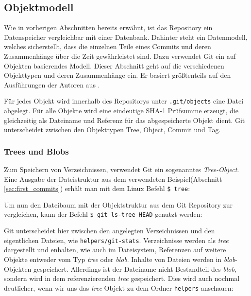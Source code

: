 \subsection{Objektmodell}\label{sec:objectmodel}
Wie in vorherigen Abschnitten bereits erwähnt, ist das Repository ein
Datenspeicher vergleichbar mit einer Datenbank. Dahinter steht ein Datenmodell,
welches sicherstellt, dass die einzelnen Teile eines Commits und deren
Zusammenhänge über die Zeit gewährleistet sind. Dazu verwendet Git ein auf
Objekten basierendes Modell. Dieser Abschnitt geht auf die verschiedenen
Objekttypen und deren Zusammenhänge ein. Er basiert größtenteils auf den
Ausführungen der Autoren aus \cite[S.~49-59]{gitosp}.

Für jedes Objekt wird innerhalb des Repositorys unter \texttt{.git/objects}
eine Datei abgelegt. Für alle Objekte wird eine eindeutige \gls{SHA-1}
Prüfsumme erzeugt, die gleichzeitig als Dateiname und Referenz für das
abgespeicherte Objekt dient. Git unterscheidet zwischen den Objekttypen Tree,
Object, Commit und Tag.

\subsubsection{Trees und Blobs}\label{sec:treeblobobjects}
Zum Speichern von Verzeichnissen, verwendet Git ein sogenanntes
\textit{Tree-Object}. Eine Ausgabe der Dateistruktur aus dem verwendeten
Beispiel(Abschnitt \ref{sec:first_commits}) erhält man mit dem Linux Befehl
\texttt{\$ tree}:


Um nun den Dateibaum mit der Objektstruktur aus dem Git Repository zur
vergleichen, kann der Befehl \texttt{\$ git ls-tree HEAD} genutzt werden:


Git unterscheidet hier zwischen den angelegten Verzeichnissen und den
eigentlichen Dateien, wie \texttt{helpers/git-stats}. Verzeichnisse werden als
\textit{tree} dargestellt und enhalten, wie auch im Dateisystem, Referenzen auf
weitere Objekte entweder vom Typ \textit{tree} oder \textit{blob}.  Inhalte von
Dateien werden in \textit{blob}-Objekten gespeichert. Allerdings ist der
Dateiname nicht Bestandteil des \textit{blob}, sondern wird in dem
referenzierenden \textit{tree} gespeichert. Dies wird auch nochmal deutlicher,
wenn wir uns das \textit{tree} Objekt zu dem Ordner \texttt{helpers} anschauen:

